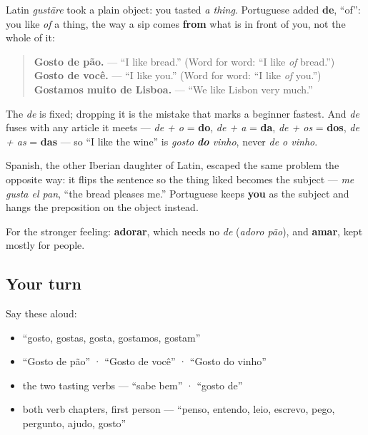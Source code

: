 \begin{grammarlens}[title={Grammar Lens: why the \emph{de} is not optional}]
Latin \emph{gustāre} took a plain object: you tasted \emph{a thing}. Portuguese added \textbf{de}, \textquotedblleft{}of\textquotedblright{}: you like \emph{of} a thing, the way a sip comes \textbf{from} what is in front of you, not the whole of it:

\begin{quote}
\textbf{Gosto de pão.} — \textquotedblleft{}I like bread.\textquotedblright{} (Word for word: \textquotedblleft{}I like \emph{of} bread.\textquotedblright{}) \textbf{Gosto de você.} — \textquotedblleft{}I like you.\textquotedblright{} (Word for word: \textquotedblleft{}I like \emph{of} you.\textquotedblright{}) \textbf{Gostamos muito de Lisboa.} — \textquotedblleft{}We like Lisbon very much.\textquotedblright{}
\end{quote}

The \emph{de} is fixed; dropping it is the mistake that marks a beginner fastest. And \emph{de} fuses with any article it meets — \emph{de + o} = \textbf{do}, \emph{de + a} = \textbf{da}, \emph{de + os} = \textbf{dos}, \emph{de + as} = \textbf{das} — so \textquotedblleft{}I like the wine\textquotedblright{} is \emph{gosto \textbf{do} vinho}, never \emph{de o vinho}.

Spanish, the other Iberian daughter of Latin, escaped the same problem the opposite way: it flips the sentence so the thing liked becomes the subject — \emph{me gusta el pan}, \textquotedblleft{}the bread pleases me.\textquotedblright{} Portuguese keeps \textbf{you} as the subject and hangs the preposition on the object instead.

For the stronger feeling: \textbf{adorar}, which needs no \emph{de} (\emph{adoro pão}), and \textbf{amar}, kept mostly for people.
\end{grammarlens}

\subsection*{Your turn}
Say these aloud:

\begin{itemize}
\raggedright
  \item \textquotedblleft{}gosto, gostas, gosta, gostamos, gostam\textquotedblright{}
  \item \textquotedblleft{}Gosto de pão\textquotedblright{} · \textquotedblleft{}Gosto de você\textquotedblright{} · \textquotedblleft{}Gosto do vinho\textquotedblright{}
  \item the two tasting verbs — \textquotedblleft{}sabe bem\textquotedblright{} · \textquotedblleft{}gosto de\textquotedblright{}
  \item both verb chapters, first person — \textquotedblleft{}penso, entendo, leio, escrevo, pego, pergunto, ajudo, gosto\textquotedblright{}
\end{itemize}

